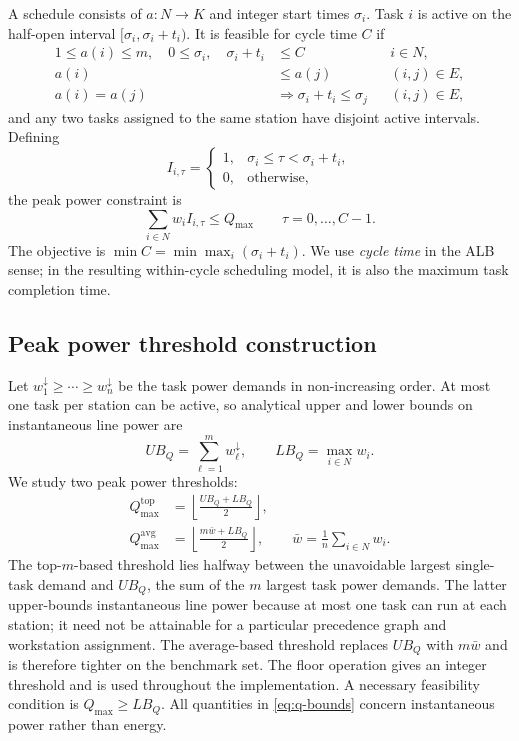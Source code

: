 \documentclass[]{interact}
\theoremstyle{plain}
\theoremstyle{definition}
\theoremstyle{remark}
\newcommand{\Qmax}{Q_{\max}}
\begin{document}
A schedule consists of $a:N\rightarrow K$ and integer start times $\sigma_i$. Task $i$ is active on the half-open interval $[\sigma_i,\sigma_i+t_i)$. It is feasible for cycle time $C$ if
\begin{align}
1\leq a(i)\leq m,\quad 0\leq\sigma_i,\quad \sigma_i+t_i&\leq C && i\in N, \label{eq:domain}\\
a(i)&\leq a(j) && (i,j)\in E, \label{eq:station-prec}\\
a(i)=a(j)&\Rightarrow \sigma_i+t_i\leq\sigma_j && (i,j)\in E, \label{eq:time-prec}
\end{align}
and any two tasks assigned to the same station have disjoint active intervals. Defining
\[
I_{i,\tau}=\begin{cases}1,&\sigma_i\leq\tau<\sigma_i+t_i,\\0,&\text{otherwise},\end{cases}
\]
the peak power constraint is
\begin{equation}
\sum_{i\in N}w_i I_{i,\tau}\leq\Qmax
\qquad \tau=0,\ldots,C-1.
\label{eq:power-cap}
\end{equation}
The objective is $\min C=\min\max_i(\sigma_i+t_i)$. We use \emph{cycle time} in the ALB sense; in the resulting within-cycle scheduling model, it is also the maximum task completion time.

\subsection{Peak power threshold construction}

Let $w_1^{\downarrow}\geq\cdots\geq w_n^{\downarrow}$ be the task power demands in non-increasing order. At most one task per station can be active, so analytical upper and lower bounds on instantaneous line power are
\begin{equation}
UB_Q=\sum_{\ell=1}^{m}w_\ell^{\downarrow},
\qquad LB_Q=\max_{i\in N}w_i.
\label{eq:q-bounds}
\end{equation}
We study two peak power thresholds:
\begin{align}
Q_{\max}^{\mathrm{top}}&=\left\lfloor\frac{UB_Q+LB_Q}{2}\right\rfloor, \label{eq:q-top}\\
Q_{\max}^{\mathrm{avg}}&=\left\lfloor\frac{m\bar w+LB_Q}{2}\right\rfloor,
\qquad \bar w=\frac{1}{n}\sum_{i\in N}w_i. \label{eq:q-avg}
\end{align}
The top-$m$-based threshold lies halfway between the unavoidable largest single-task demand and $UB_Q$, the sum of the $m$ largest task power demands. The latter upper-bounds instantaneous line power because at most one task can run at each station; it need not be attainable for a particular precedence graph and workstation assignment. The average-based threshold replaces $UB_Q$ with $m\bar w$ and is therefore tighter on the benchmark set. The floor operation gives an integer threshold and is used throughout the implementation. A necessary feasibility condition is $\Qmax\geq LB_Q$. All quantities in \eqref{eq:q-bounds} concern instantaneous power rather than energy.
\end{document}
